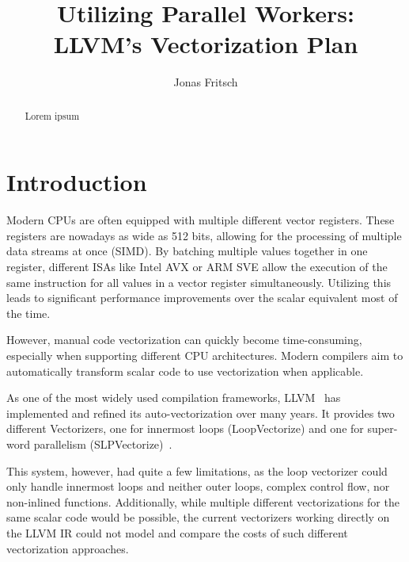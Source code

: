 \documentclass[sigplan,11pt,nonacm]{acmart}
\begin{document}
\title{Utilizing Parallel Workers: \\LLVM's Vectorization Plan}
\author{Jonas Fritsch}

\begin{abstract}
Lorem ipsum
\end{abstract}

\maketitle



\section{Introduction}
\label{sec:introduction}
Modern CPUs are often equipped with multiple different vector registers. These registers are nowadays 
as wide as 512 bits, allowing for the processing of multiple data streams at once (SIMD). By 
batching multiple values together in one register, different ISAs like Intel AVX or ARM SVE allow 
the execution of the same instruction for all values in a vector register simultaneously. 
Utilizing this leads to significant performance improvements over the scalar equivalent most of 
the time.

However, manual code vectorization can quickly become time-consuming, especially when
supporting different CPU architectures. Modern compilers aim to automatically transform scalar code
to use vectorization when applicable.

As one of the most widely used compilation frameworks, LLVM~\cite{10.5555/977395.977673} has 
implemented and refined its auto-vectorization over many years. It provides two different 
Vectorizers, one for innermost loops (LoopVectorize) and one for super-word parallelism 
(SLPVectorize)~\cite{llvmvec}.

This system, however, had quite a few limitations, as the loop vectorizer could only handle
innermost loops and neither outer loops, complex control flow, nor non-inlined functions. 
Additionally, while multiple different vectorizations for the same scalar code 
would be possible, the current vectorizers working directly on the LLVM IR could not model
and compare the costs of such different vectorization approaches.
\end{document}
